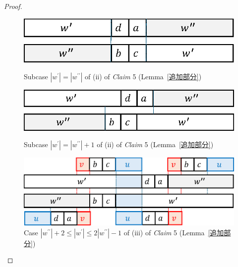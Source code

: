 \begin{proof}
\begin{figure}[t]
  \begin{center}
    \includegraphics[scale=0.45]{figs/w=w_1.eps}
    \caption{Subcase $|w^{\prime}| = |w^{\prime\prime}|$ of (ii) of \textit{Claim} 5 (Lemma~\ref{追加部分})}\label{追加部分7}
    \bigskip
    \includegraphics[scale=0.45]{figs/w=w_1+1.eps}
    \caption{Subcase $|w^{\prime}| = |w^{\prime\prime}| + 1$ of (ii) of \textit{Claim} 5 (Lemma~\ref{追加部分})}\label{追加部分8}
  \end{center}
\end{figure}

\begin{figure}[t]
  \begin{center}
    \includegraphics[scale=0.45]{figs/w=w_1+2.eps}
    \caption{Case $|w^{\prime\prime}| + 2 \le |w^{\prime}| \le 2|w^{\prime\prime}| - 1$ of (iii) of \textit{Claim} 5 (Lemma~\ref{追加部分})}\label{w1+3}
  \end{center}
\end{figure}


\end{proof}
